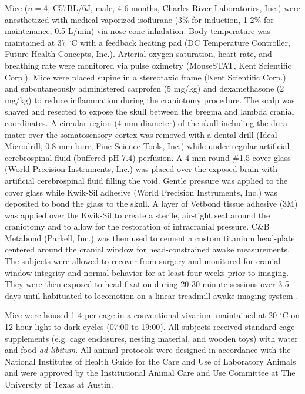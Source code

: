 \documentclass[review]{elsarticle}
\begin{document}
Mice ($n = 4$, C57BL/6J, male, 4-6 months, Charles River Laboratories, Inc.) were anesthetized with medical  vaporized isoflurane (3\% for induction, 1-2\% for maintenance, 0.5 L/min) via nose-cone inhalation. Body temperature was maintained at 37 $^\circ$C with a feedback heating pad (DC Temperature Controller, Future Health Concepts, Inc.). Arterial oxygen saturation, heart rate, and breathing rate were monitored via pulse oximetry (MouseSTAT, Kent Scientific Corp.). Mice were placed supine in a stereotaxic frame (Kent Scientific Corp.) and subcutaneously administered carprofen (5 mg/kg) and dexamethasone (2 mg/kg) to reduce inflammation during the craniotomy procedure. The scalp was shaved and resected to expose the skull between the bregma and lambda cranial coordinates. A circular region (4 mm diameter) of the skull including the dura mater over the somatosensory cortex was removed with a dental drill (Ideal Microdrill, 0.8 mm burr, Fine Science Tools, Inc.) while under regular artificial cerebrospinal fluid (buffered pH 7.4) perfusion. A 4 mm round \#1.5 cover glass (World Precision Instruments, Inc.) was placed over the exposed brain with artificial cerebrospinal fluid filling the void. Gentle pressure was applied to the cover glass while Kwik-Sil adhesive (World Precision Instruments, Inc.) was deposited to bond the glass to the skull. A layer of Vetbond tissue adhesive (3M) was applied over the Kwik-Sil to create a sterile, air-tight seal around the craniotomy and to allow for the restoration of intracranial pressure. C\&B Metabond (Parkell, Inc.) was then used to cement a custom titanium head-plate centered around the cranial window for head-constrained awake measurements. The subjects were allowed to recover from surgery and monitored for cranial window integrity and normal behavior for at least four weeks prior to imaging. They were then exposed to head fixation during 20-30 minute sessions over 3-5 days until habituated to locomotion on a linear treadmill awake imaging system \cite{He:2020}.

Mice were housed 1-4 per cage in a conventional vivarium maintained at 20 $^\circ$C on 12-hour light-to-dark cycles (07:00 to 19:00). All subjects received standard cage supplements (e.g. cage enclosures, nesting material, and wooden toys) with water and food \textit{ad libitum}. All animal protocols were designed in accordance with the National Institutes of Health Guide for the Care and Use of Laboratory Animals and were approved by the Institutional Animal Care and Use Committee at The University of Texas at Austin.
\end{document}
